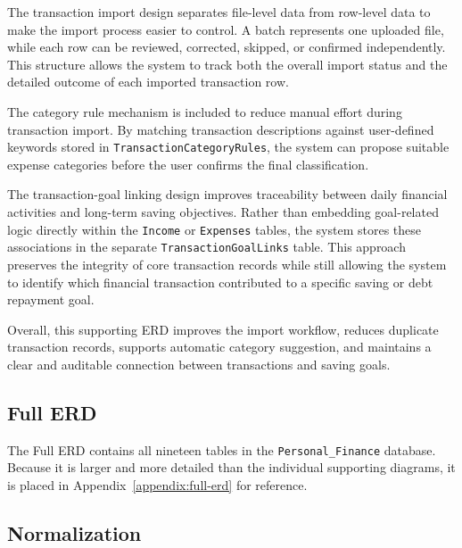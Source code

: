 ﻿\documentclass{article}
\begin{document}
The transaction import design separates file-level data from row-level data to make the import
process easier to control. A batch represents one uploaded file, while each row can be reviewed,
corrected, skipped, or confirmed independently. This structure allows the system to track both the
overall import status and the detailed outcome of each imported transaction row.

The category rule mechanism is included to reduce manual effort during transaction import. By
matching transaction descriptions against user-defined keywords stored in
\texttt{TransactionCategoryRules}, the system can propose suitable expense categories before the
user confirms the final classification.

The transaction-goal linking design improves traceability between daily financial activities and
long-term saving objectives. Rather than embedding goal-related logic directly within the
\texttt{Income} or \texttt{Expenses} tables, the system stores these associations in the separate
\texttt{TransactionGoalLinks} table. This approach preserves the integrity of core transaction
records while still allowing the system to identify which financial transaction contributed to a
specific saving or debt repayment goal.

Overall, this supporting ERD improves the import workflow, reduces duplicate transaction records,
supports automatic category suggestion, and maintains a clear and auditable connection between
transactions and saving goals.

\subsection{Full ERD}

The Full ERD contains all nineteen tables in the \texttt{Personal\_Finance} database. Because it
is larger and more detailed than the individual supporting diagrams, it is placed in
Appendix~\ref{appendix:full-erd} for reference.

\subsection{Normalization}
\end{document}

